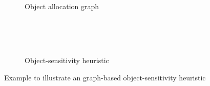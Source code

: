 \begin{figure}
\begin{multicols}{2}
\begin{flushright}
\begin{subfigure}[t]{0.6\columnwidth}
\begin{center}
{
		}
	\end{center}
	\caption{\centering Object allocation graph}
        \label{fig:oag}
\end{subfigure}
~\\~\\~\\
\begin{subfigure}[t]{0.6\columnwidth}	
	\begin{center}
	\end{center}
	\caption{\centering Object-sensitivity heuristic}
        \label{fig:oag_heuristic}
\end{subfigure}
\end{flushright}
\end{multicols}
\caption{Example to illustrate an graph-based object-sensitivity heuristic}
\end{figure}


